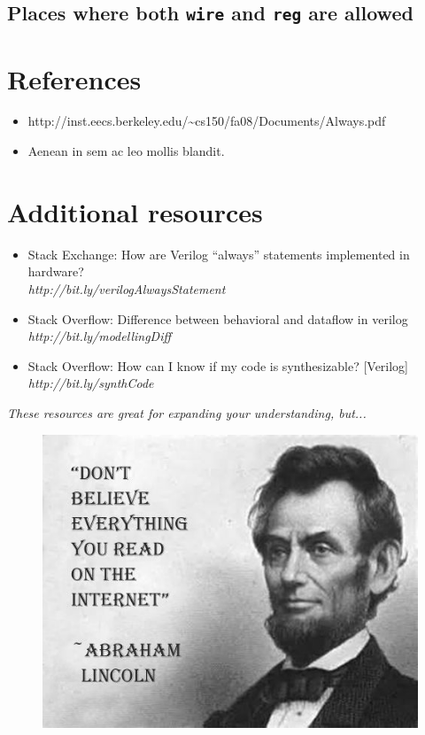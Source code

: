 \documentclass[a4paper,10pt]{article}
\theoremstyle{mytheor}
\begin{document}
\subsection{Places where both \lstinline[style=verilog-inline-style]{wire} and \lstinline[style=verilog-inline-style]{reg} are allowed}


\section*{References}
\begin{itemize}
  \small 
\item http://inst.eecs.berkeley.edu/{\textasciitilde}cs150/fa08/Documents/Always.pdf
\item Aenean in sem ac leo mollis blandit.  
\end{itemize}

\section*{Additional resources}
\begin{itemize}
  \small 
\item Stack Exchange: How are Verilog “always” statements implemented in hardware? \\\textit{http://bit.ly/verilogAlwaysStatement}
\item Stack Overflow: Difference between behavioral and dataflow in verilog \\\textit{http://bit.ly/modellingDiff}
\item Stack Overflow: How can I know if my code is synthesizable? [Verilog] \\\textit{http://bit.ly/synthCode}
\end{itemize} 

\centerline{\textit{These resources are great for expanding your understanding, but...}}
\begin{centering}
  \begin{figure}[!h] \centering  
    \includegraphics[width=0.5\linewidth]{./resources/meme.jpeg} 
  \end{figure}  
\end{centering}
\end{document}
